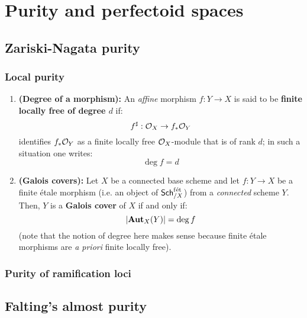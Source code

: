 \chapter{Purity and perfectoid spaces}
    \begin{abstract}
        
    \end{abstract}
    
    \minitoc
    
    \section{Zariski-Nagata purity}
        \subsection{Local purity}
            \begin{definition} \label{def: galois_covers}
                \noindent
                \begin{enumerate}
                    \item \textbf{(Degree of a morphism):} An \textit{affine} morphism $f: Y \to X$ is said to be \textbf{finite locally free of degree $d$} if:
                        $$f^{\sharp}: \mathcal{O}_X \to f_*\mathcal{O}_Y$$
                    identifies $f_*\mathcal{O}_Y$ as a finite locally free $\mathcal{O}_X$-module that is of rank $d$; in such a situation one writes:
                        $$\deg f = d$$
                    \item \textbf{(Galois covers):} Let $X$ be a connected base scheme and let $f: Y \to X$ be a finite \'etale morphism (i.e. an object of $\mathsf{Sch}_{/X}^{\mathrm{f\acute{e}t}}$) from a \textit{connected} scheme $Y$. Then, $Y$ is a \textbf{Galois cover} of $X$ if and only if:
                        $$|\mathbf{Aut}_X(Y)| = \deg f$$
                    (note that the notion of degree here makes sense because finite \'etale morphisms are \textit{a priori} finite locally free).
                \end{enumerate}
            \end{definition}
        
        \subsection{Purity of ramification loci}
    
    \section{Falting's almost purity}
    
